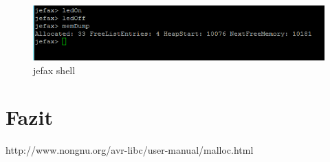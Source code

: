 \documentclass[fontsize=12pt, toc=bibliography, notitlepage]{scrreprt}
\begin{document}
\begin{figure}[H]
	\centering
	\includegraphics[width=450px]{images/shell.png}
	\caption{jefax shell}
	\label{fig:shell}
\end{figure}

\chapter{Fazit}
\label{chap:fazit}

\begin{thebibliography}{999}
http://www.nongnu.org/avr-libc/user-manual/malloc.html
\end{thebibliography}

\cleardoublepage
{}
\listoffigures
\end{document}
